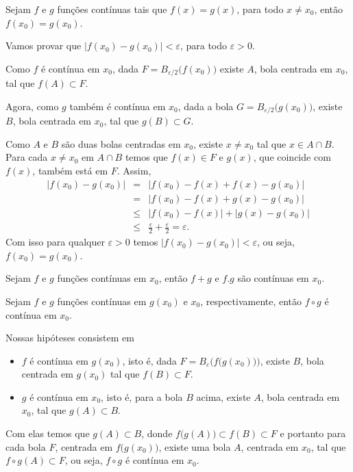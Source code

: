 \documentclass{book}
\begin{document}
\begin{teo}
  Sejam $f$ e $g$ funções contínuas tais que $f(x)=g(x)$, para todo $x
  \ne x_0$, então $f(x_0)=g(x_0)$.
\end{teo}

\begin{dem}
  Vamos provar que $\big|f(x_0)-g(x_0)\big|<\varepsilon$, para todo
  $\varepsilon>0$.

  Como $f$ é contínua em $x_0$, dada $F=B_{\varepsilon\slash
    2}\big(f(x_0)\big)$ existe $A$, bola centrada em $x_0$, tal que
  $f(A)\subset F$.

  Agora, como $g$ também é contínua em $x_0$, dada a bola
  $G=B_{\varepsilon\slash 2}\big(g(x_0)\big)$, existe $B$, bola
  centrada em $x_0$, tal que $g(B)\subset G$.

  Como $A$ e $B$ são duas bolas centradas em $x_0$, existe $x\ne x_0$
  tal que $x\in A \cap B$. Para cada $x\ne x_0$ em $A\cap B$ temos que
  $f(x)\in F$ e $g(x)$, que coincide com $f(x)$, também está em
  $F$. Assim,
  \begin{eqnarray*}
    \big|f(x_0)-g(x_0)\big|&=&\big|f(x_0)-f(x)+f(x)-g(x_0)\big|\\
    &=&\big|f(x_0)-f(x)+g(x)-g(x_0)\big|\\
    &\leq&\big|f(x_0)-f(x)\big|+\big|g(x)-g(x_0)\big|\\
    &\leq&\frac{\varepsilon}{2} + \frac{\varepsilon}{2}=\varepsilon.
  \end{eqnarray*}
  Com isso para qualquer $\varepsilon>0$ temos
  $\big|f(x_0)-g(x_0)\big|<\varepsilon$, ou seja, $f(x_0)=g(x_0)$.
\end{dem}

\begin{teo}
  Sejam $f$ e $g$ funções contínuas em $x_0$, então $f+g$ e $f.g$ são
  contínuas em $x_0$.
\end{teo}

\begin{dem}
\end{dem}

\begin{teo}
  Sejam $f$ e $g$ funções contínuas em $g(x_0)$ e $x_0$,
  respectivamente, então $f \circ g$ é contínua em $x_0$.
\end{teo}

\begin{dem}
  Nossas hipóteses consistem em
  \begin{itemize}
    \item $f$ é contínua em $g\left( {x_0 } \right)$, isto é, dada
    $F=B_\varepsilon\Big(f\big(g(x_0)\big)\Big)$, existe $B$, bola
    centrada em $g(x_0)$ tal que $f(B)\subset F$.
    \item $g$ é contínua em $x_0 $, isto é, para a bola $B$ acima,
    existe $A$, bola centrada em $x_0$, tal que $g(A)\subset B$.
  \end{itemize}

  Com elas temos que $g(A)\subset B$, donde $f\big(g(A)\big)\subset
  f(B)\subset F$ e portanto para cada bola $F$, centrada em
  $f\big(g(x_0)\big)$, existe uma bola $A$, centrada em $x_0$, tal que
  $f\circ g(A)\subset F$, ou seja, $f\circ g$ é contínua em $x_0$.
\end{dem}
\end{document}
